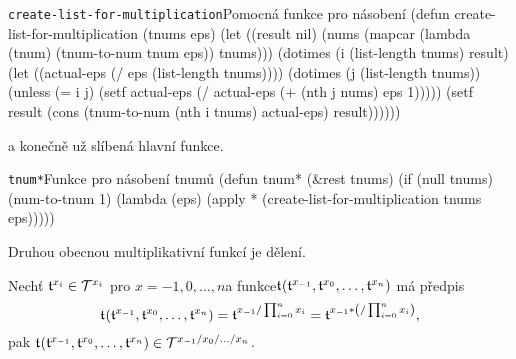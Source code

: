 \begin{lispcode}{\texttt{create-list-for-multiplication}}{Pomocná fun\-kce pro násobení}
(\textcolor{funkcionalni}{defun} \textcolor{pojmenovan}{create-list-for-multiplication} (tnums eps)
  (\textcolor{vedlejsi}{let} ((result nil)
        (nums
         (\textcolor{funkcionalni}{mapcar} (\textcolor{funkcionalni}{lambda} (tnum) (\textcolor{moje}{tnum-to-num} tnum eps)) tnums)))
    (\textcolor{funkcionalni}{dotimes} (i (\textcolor{funkcionalni}{list-length} tnums) result)
      (\textcolor{vedlejsi}{let} ((actual-eps (\textcolor{matematicke}{/} eps (\textcolor{funkcionalni}{list-length} tnums))))
        (\textcolor{funkcionalni}{dotimes} (j (\textcolor{funkcionalni}{list-length} tnums))
          (\textcolor{funkcionalni}{unless} (\textcolor{matematicke}{=} i j)
            (\textcolor{vedlejsi}{setf} actual-eps (\textcolor{matematicke}{/} actual-eps
                                (\textcolor{matematicke}{+} (\textcolor{funkcionalni}{nth} j nums) eps 1)))))
        (\textcolor{vedlejsi}{setf} result (cons
                      (\textcolor{moje}{tnum-to-num} (\textcolor{funkcionalni}{nth} i tnums) actual-eps)
                      result))))))
\end{lispcode}

a konečně už slíbená hlavní funkce.

\begin{lispcode}{\texttt{tnum*}}{Funkce pro násobení tnumů}
(\textcolor{funkcionalni}{defun} \textcolor{pojmenovan}{tnum*} (&rest tnums)
  (\textcolor{funkcionalni}{if} (\textcolor{funkcionalni}{null} tnums)
      (\textcolor{moje}{num-to-tnum} 1)
    (\textcolor{funkcionalni}{lambda} (eps)
      (\textcolor{funkcionalni}{apply} \textquotesingle\textcolor{moje}{*} (\textcolor{moje}{create-list-for-multiplication} tnums eps)))))
\end{lispcode}

Druhou obecnou multiplikativní funkcí je dělení.

\begin{fact}
Nechť $\mathfrak{t}^{x_i}\in\mathcal{T}^{x_i}$ pro $x=-1,0,\ldots ,n$a funkce{\newline}$\mathfrak{t}^{}(\mathfrak{t}^{x_{-1}},\mathfrak{t}^{x_0},\ldots,\mathfrak{t}^{x_n})$ má předpis
\begin{equation}
\mathfrak{t}^{}(\mathfrak{t}^{x_{-1}},\mathfrak{t}^{x_0},\ldots,\mathfrak{t}^{x_n})=\mathfrak{t}^{x_{-1}/\prod_{i=0}^nx_i}=\mathfrak{t}^{x_{-1}*\left(/\prod_{i=0}^nx_i\right)},
\end{equation}
pak $\mathfrak{t}^{}(\mathfrak{t}^{x_{-1}},\mathfrak{t}^{x_0},\ldots,\mathfrak{t}^{x_n})\in\mathcal{T}^{x_{-1}/x_0/\ldots /x_n}$.
\end{fact}

